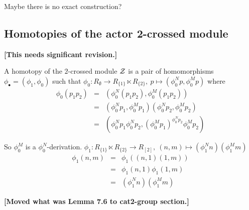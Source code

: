 Maybe there is no exact construction?

\vspace*{10mm}


\subsection{Homotopies of the actor 2-crossed module}

{\bf [This needs significant revision.]}

\begin{defn}
A homotopy of the $2$-crossed module $\mathcal{Z}$
is a pair of homomorphisms $\phi_{\bullet} = (\phi_1,\phi_0)$
such that 
$\phi_0: R_{\emptyset} \to R_{\{1\}} \ltimes R_{\{2\}}, \ 
 p \mapsto(\phi_0^{N}p, \phi_0^{M}p)$ where
\begin{eqnarray*}
\phi_0(p_1p_2) 
  & = &  (\phi_0^{N}(p_1p_2), \phi_0^{M}(p_1p_2)) \\
  & = &  (\phi_0^{N}p_1, \phi_0^{M}p_1)(\phi_0^{N}p_2, \phi_0^{M}p_2) \\
  & = &  (\phi_0^{N}p_1 \phi_0^{N}p_2, 
          (\phi_0^{M}p_1)^{\phi_0^{N}p_2} \phi_0^{M}p_2)
\end{eqnarray*}
\end{defn}

So $\phi_0^{M}$ is a $\phi_0^{N}$-derivation.
$\phi_1:  R_{\{1\}} \ltimes R_{\{2\}} \to R_{[2]}, \ 
 (n, m) \mapsto (\phi_1^{N}n)( \phi_1^{M}m)$
\begin{eqnarray*}
\phi_1(n,m) & = & \phi_1((n,1)(1, m)) \\
                       & = & \phi_1(n,1) \phi_1(1,m) \\
                       & = & (\phi_1^{N}n)( \phi_1^{M}m)
\end{eqnarray*}
      
\bigskip\noindent
{\bf [Moved what was Lemma 7.6 to cat2-group section.]}

